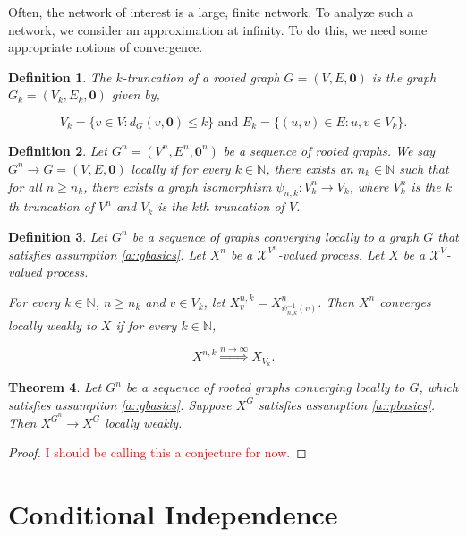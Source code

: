\documentclass[12pt]{article}
\newcommand{\mb}{\mathbb}
\newcommand{\mc}{\mathcal}
\newcommand{\ra}{\rightarrow}
\newcommand{\os}{\overset}
\newcommand{\te}{\text}
\newcommand{\tr}{\textcolor{red}}
\newcommand{\ind}{\hspace{24pt}}
\newcommand{\sta}{\mc{X}}							%
\renewcommand{\root}{\mathbf{0}}
\newcommand{\indx}[1]{^{#1}}						%
\newcommand{\Xf}{X}									%
\newcommand{\vind}[1]{_{#1}}						%
\newcommand{\gind}[1]{^{#1}}						%
\newcommand{\trnc}[1]{_{#1}}						%
\newtheorem{thms}{Theorem}[section]
\newtheorem{defn}[thms]{Definition}
\begin{document}
Often, the network of interest is a large, finite network. To analyze such a network, we consider an approximation at infinity. To do this, we need some appropriate notions of convergence.

\begin{defn}
The \(k\)-truncation of a rooted graph \(G = (V,E,\root)\) is the graph \(G\trnc{k}=(V\trnc{k},E\trnc{k},\root)\) given by,

\[V\trnc{k} = \{v \in V: d_G(v,\root) \leq k\} \te{ and } E\trnc{k} = \{(u,v) \in E: u,v \in V\trnc{k}\}.\]
\label{WP::trunc}
\end{defn}

\begin{defn}
Let \(G\indx{n} = (V\indx{n},E\indx{n},\root\indx{n})\) be a sequence of rooted graphs. We say \(G\indx{n} \ra G = (V,E,\root)\) locally if for every \(k\in \mb{N}\), there exists an \(n_k \in \mb{N}\) such that for all \(n \geq n_k\), there exists a graph isomorphism \(\psi_{n,k}: V\indx{n}\trnc{k} \ra V\trnc{k}\), where \(V\indx{n}\trnc{k}\) is the \(k\)th truncation of \(V\indx{n}\) and \(V\trnc{k}\) is the \(k\)th truncation of \(V\).
\label{WP::locconv}
\end{defn}

\begin{defn}
Let \(G^n\) be a sequence of graphs converging locally to a graph \(G\) that satisfies assumption \ref{a::gbasics}. Let \(\Xf\indx{n}\) be a \(\sta^{V\indx{n}}\)-valued process. Let \(\Xf\) be a \(\sta^V\)-valued process. 

\ind For every \(k\in \mb{N}\), \(n \geq n_k\) and \(v \in V\trnc{k}\), let \(\Xf\indx{n,k}\vind{v} = \Xf\indx{n}\vind{\psi_{n,k}^{-1}(v)}\). Then \(\Xf^n\) converges locally weakly to \(\Xf\) if for every \(k \in \mb{N}\),

\[\Xf^{n,k} \os{n\ra\infty}{\Rightarrow} \Xf_{V_k}.\]
\label{WP::locweak}
\end{defn}

\begin{thms}
Let \(G\indx{n}\) be a sequence of rooted graphs converging locally to \(G\), which satisfies assumption \ref{a::gbasics}. Suppose \(\Xf\gind{G}\) satisfies assumption \ref{a::pbasics}. Then \(\Xf\gind{G\indx{n}} \ra \Xf\gind{G}\) locally weakly.
\label{WP::lblocweak}
\end{thms}
\begin{proof}
\tr{I should be calling this a conjecture for now.}
\end{proof}

\section{Conditional Independence}
\label{CI}
\end{document}
